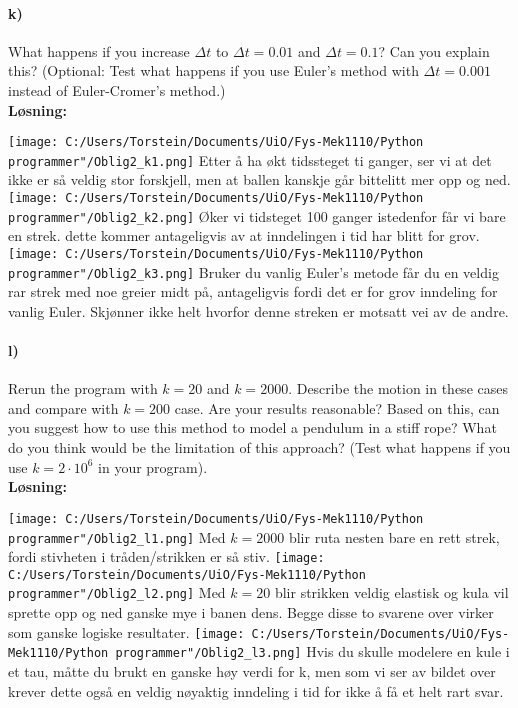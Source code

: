 \documentclass[11pt, A4paper,norsk]{article}
\begin{document}
		\paragraph{k)}
			\begin{flushleft}
What happens if you increase $\Delta t$ to $\Delta t = 0.01$ and $\Delta t = 0.1$? Can you explain this? (Optional: Test what happens if you use Euler’s method with $\Delta t = 0.001$ instead of Euler-Cromer’s method.) \\
\vspace{1mm}
\textbf{Løsning:} \\
\vspace{1mm}

\texttt{[image: C:/Users/Torstein/Documents/UiO/Fys-Mek1110/Python programmer"/Oblig2\_k1.png]}
Etter å ha økt tidssteget ti ganger, ser vi at det ikke er så veldig stor forskjell, men at ballen kanskje går bittelitt mer opp og ned.
\texttt{[image: C:/Users/Torstein/Documents/UiO/Fys-Mek1110/Python programmer"/Oblig2\_k2.png]}
Øker vi tidsteget 100 ganger istedenfor får vi bare en strek. dette kommer antageligvis av at inndelingen i tid har blitt for grov.
\texttt{[image: C:/Users/Torstein/Documents/UiO/Fys-Mek1110/Python programmer"/Oblig2\_k3.png]}
Bruker du vanlig Euler's metode får du en veldig rar strek med noe greier midt på, antageligvis fordi det er for grov inndeling for vanlig Euler. Skjønner ikke helt hvorfor denne streken er motsatt vei av de andre.
			\end{flushleft}
		\paragraph{l)}
			\begin{flushleft}
Rerun the program with $k = 20$ and $k = 2000$. Describe the motion in these cases and compare with $k = 200$ case. Are your results reasonable? Based on this, can you suggest how to use this method to model a pendulum in a stiff rope? What do you think would be the limitation of this approach? (Test what happens if you use $k = 2\cdot10^6$ in your program). \\
\vspace{1mm}
\textbf{Løsning:} \\
\vspace{1mm}

\texttt{[image: C:/Users/Torstein/Documents/UiO/Fys-Mek1110/Python programmer"/Oblig2\_l1.png]}
Med $k = 2000$ blir ruta nesten bare en rett strek, fordi stivheten i tråden/strikken er så stiv.
\texttt{[image: C:/Users/Torstein/Documents/UiO/Fys-Mek1110/Python programmer"/Oblig2\_l2.png]}
Med $k = 20$ blir strikken veldig elastisk og kula vil sprette opp og ned ganske mye i banen dens.
Begge disse to svarene over virker som ganske logiske resultater.
\texttt{[image: C:/Users/Torstein/Documents/UiO/Fys-Mek1110/Python programmer"/Oblig2\_l3.png]}
Hvis du skulle modelere en kule i et tau, måtte du brukt en ganske høy verdi for k, men som vi ser av bildet over krever dette også en veldig nøyaktig inndeling i tid for ikke å få et helt rart svar.
			\end{flushleft}
\end{document}
